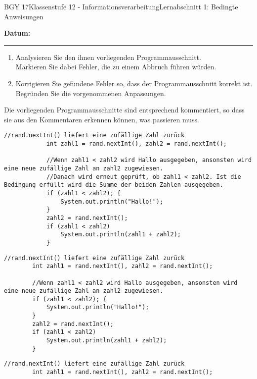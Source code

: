 \documentclass[oneside,openany,headings=optiontotoc,11pt,numbers=noenddot]{scrreprt}
\begin{document}
	\begin{worksheet}{BGY 17}{Klassenstufe 12 - Informationsverarbeitung}{Lernabschnitt 1: Bedingte Anweisungen}
				
		\noindent
		\sffamily
		\textbf{Datum:}
		\rule{0.91\textwidth}{0.4pt}
		\begin{framed}
			\noindent
			\begin{enumerate}
				\item Analysieren Sie den ihnen vorliegenden Programmausschnitt.\\
				Markieren Sie dabei Fehler, die zu einem Abbruch führen würden.
				\item Korrigieren Sie gefundene Fehler so, dass der Programmausschnitt korrekt ist. Begründen Sie die vorgenommenen Anpassungen.
			\end{enumerate}
			\par\noindent
			Die vorliegenden Programmausschnitte sind entsprechend kommentiert, so dass sie aus den Kommentaren erkennen können, was passieren muss.
		\end{framed}
		\newpage
		\pagestyle{empty}
		\begin{lstlisting}[style=JavaInputStyle]
			//rand.nextInt() liefert eine zufällige Zahl zurück
			int zahl1 = rand.nextInt(), zahl2 = rand.nextInt();
			
			//Wenn zahl1 < zahl2 wird Hallo ausgegeben, ansonsten wird eine neue zufällige Zahl an zahl2 zugewiesen.
			//Danach wird erneut geprüft, ob zahl1 < zahl2. Ist die Bedingung erfüllt wird die Summe der beiden Zahlen ausgegeben.
			if (zahl1 < zahl2); {
				System.out.println("Hallo!");
			}
			zahl2 = rand.nextInt();
			if (zahl1 < zahl2)
				System.out.println(zahl1 + zahl2);
			}
		\end{lstlisting}
		\newpage
		\begin{lstlisting}[style=JavaInputStyle]
		//rand.nextInt() liefert eine zufällige Zahl zurück
		int zahl1 = rand.nextInt(), zahl2 = rand.nextInt();
		
		//Wenn zahl1 < zahl2 wird Hallo ausgegeben, ansonsten wird eine neue zufällige Zahl an zahl2 zugewiesen.
		if (zahl1 < zahl2); {
			System.out.println("Hallo!");
		}
		zahl2 = rand.nextInt();
		if (zahl1 < zahl2)
			System.out.println(zahl1 + zahl2);
		}
		\end{lstlisting}
		\newpage
		\begin{lstlisting}[style=JavaInputStyle]
		//rand.nextInt() liefert eine zufällige Zahl zurück
		int zahl1 = rand.nextInt(), zahl2 = rand.nextInt();
		

\end{lstlisting}
\end{worksheet}
\end{document}
